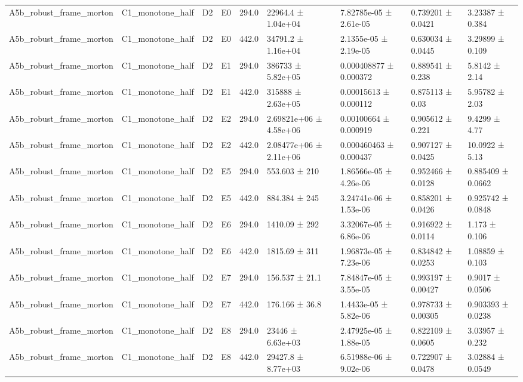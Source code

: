 \begin{table}
\begin{tabular}{lllllllll}
A5b\_robust\_frame\_morton & C1\_monotone\_half & D2 & E0 & 294.0 & 22964.4 ± 1.04e+04 & 7.82785e-05 ± 2.61e-05 & 0.739201 ± 0.0421 & 3.23387 ± 0.384 \\
A5b\_robust\_frame\_morton & C1\_monotone\_half & D2 & E0 & 442.0 & 34791.2 ± 1.16e+04 & 2.1355e-05 ± 2.19e-05 & 0.630034 ± 0.0445 & 3.29899 ± 0.109 \\
A5b\_robust\_frame\_morton & C1\_monotone\_half & D2 & E1 & 294.0 & 386733 ± 5.82e+05 & 0.000408877 ± 0.000372 & 0.889541 ± 0.238 & 5.8142 ± 2.14 \\
A5b\_robust\_frame\_morton & C1\_monotone\_half & D2 & E1 & 442.0 & 315888 ± 2.63e+05 & 0.00015613 ± 0.000112 & 0.875113 ± 0.03 & 5.95782 ± 2.03 \\
A5b\_robust\_frame\_morton & C1\_monotone\_half & D2 & E2 & 294.0 & 2.69821e+06 ± 4.58e+06 & 0.00100664 ± 0.000919 & 0.905612 ± 0.221 & 9.4299 ± 4.77 \\
A5b\_robust\_frame\_morton & C1\_monotone\_half & D2 & E2 & 442.0 & 2.08477e+06 ± 2.11e+06 & 0.000460463 ± 0.000437 & 0.907127 ± 0.0425 & 10.0922 ± 5.13 \\
A5b\_robust\_frame\_morton & C1\_monotone\_half & D2 & E5 & 294.0 & 553.603 ± 210 & 1.86566e-05 ± 4.26e-06 & 0.952466 ± 0.0128 & 0.885409 ± 0.0662 \\
A5b\_robust\_frame\_morton & C1\_monotone\_half & D2 & E5 & 442.0 & 884.384 ± 245 & 3.24741e-06 ± 1.53e-06 & 0.858201 ± 0.0426 & 0.925742 ± 0.0848 \\
A5b\_robust\_frame\_morton & C1\_monotone\_half & D2 & E6 & 294.0 & 1410.09 ± 292 & 3.32067e-05 ± 6.86e-06 & 0.916922 ± 0.0114 & 1.173 ± 0.106 \\
A5b\_robust\_frame\_morton & C1\_monotone\_half & D2 & E6 & 442.0 & 1815.69 ± 311 & 1.96873e-05 ± 7.23e-06 & 0.834842 ± 0.0253 & 1.08859 ± 0.103 \\
A5b\_robust\_frame\_morton & C1\_monotone\_half & D2 & E7 & 294.0 & 156.537 ± 21.1 & 7.84847e-05 ± 3.55e-05 & 0.993197 ± 0.00427 & 0.9017 ± 0.0506 \\
A5b\_robust\_frame\_morton & C1\_monotone\_half & D2 & E7 & 442.0 & 176.166 ± 36.8 & 1.4433e-05 ± 5.82e-06 & 0.978733 ± 0.00305 & 0.903393 ± 0.0238 \\
A5b\_robust\_frame\_morton & C1\_monotone\_half & D2 & E8 & 294.0 & 23446 ± 6.63e+03 & 2.47925e-05 ± 1.88e-05 & 0.822109 ± 0.0605 & 3.03957 ± 0.232 \\
A5b\_robust\_frame\_morton & C1\_monotone\_half & D2 & E8 & 442.0 & 29427.8 ± 8.77e+03 & 6.51988e-06 ± 9.02e-06 & 0.722907 ± 0.0478 & 3.02884 ± 0.0549 \\

\end{tabular}
\end{table}
